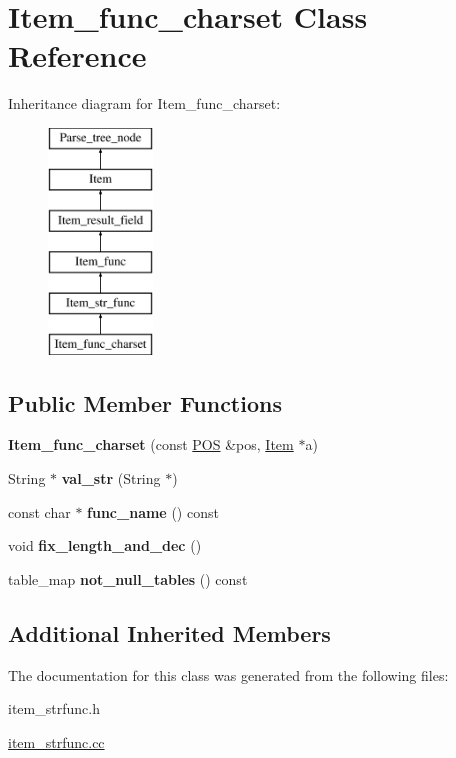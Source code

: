 \hypertarget{classItem__func__charset}{}\section{Item\+\_\+func\+\_\+charset Class Reference}
\label{classItem__func__charset}
Inheritance diagram for Item\+\_\+func\+\_\+charset\+:\begin{figure}[H]
\begin{center}
\leavevmode
\includegraphics[height=6.000000cm]{classItem__func__charset}
\end{center}
\end{figure}
\subsection*{Public Member Functions}
\begin{DoxyCompactItemize}
\item 
\mbox{\label{classItem__func__charset_ac1c562a80141eb073efde6206b589074}} 
{\bfseries Item\+\_\+func\+\_\+charset} (const \mbox{\hyperlink{structYYLTYPE}{P\+OS}} \&pos, \mbox{\hyperlink{classItem}{Item}} $\ast$a)
\item 
\mbox{\label{classItem__func__charset_a95eaeab5f7f45e7667b388c6f4926c2f}} 
String $\ast$ {\bfseries val\+\_\+str} (String $\ast$)
\item 
\mbox{\label{classItem__func__charset_ac7eb8f9c09bd5421698ba2f1c62a006a}} 
const char $\ast$ {\bfseries func\+\_\+name} () const
\item 
\mbox{\label{classItem__func__charset_a5ff522bbc68e9ab275aaf02391d331dc}} 
void {\bfseries fix\+\_\+length\+\_\+and\+\_\+dec} ()
\item 
\mbox{\label{classItem__func__charset_ad77762d6c7f3529087f36544e5ce2f52}} 
table\+\_\+map {\bfseries not\+\_\+null\+\_\+tables} () const
\end{DoxyCompactItemize}
\subsection*{Additional Inherited Members}


The documentation for this class was generated from the following files\+:\begin{DoxyCompactItemize}
\item 
item\+\_\+strfunc.\+h\item 
\mbox{\hyperlink{item__strfunc_8cc}{item\+\_\+strfunc.\+cc}}\end{DoxyCompactItemize}
